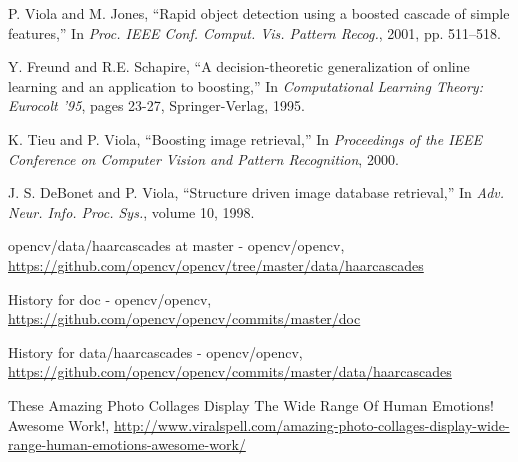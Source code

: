 \documentclass[10pt,twocolumn,letterpaper]{article}
\begin{document}
\begin{thebibliography}{9}
P. Viola and M. Jones, ``Rapid object detection using a boosted cascade of simple features,''
In \textit{Proc. IEEE Conf. Comput. Vis. Pattern Recog.}, 2001, pp. 511–518.

Y. Freund and R.E. Schapire, ``A decision-theoretic generalization of online learning and an application to boosting,''
In \textit{Computational Learning Theory: Eurocolt '95}, pages 23-27, Springer-Verlag, 1995.

K. Tieu and P. Viola, ``Boosting image retrieval,''
In \textit{Proceedings of the IEEE Conference on Computer Vision and Pattern Recognition}, 2000.

J. S. DeBonet and P. Viola, ``Structure driven image database retrieval,''
In \textit{Adv. Neur. Info. Proc. Sys.}, volume 10, 1998.

opencv/data/haarcascades at master - opencv/opencv,
\url{https://github.com/opencv/opencv/tree/master/data/haarcascades}

History for doc - opencv/opencv,
\url{https://github.com/opencv/opencv/commits/master/doc}

History for data/haarcascades - opencv/opencv,
\url{https://github.com/opencv/opencv/commits/master/data/haarcascades}

These Amazing Photo Collages Display The Wide Range Of Human Emotions! Awesome Work!,
\url{http://www.viralspell.com/amazing-photo-collages-display-wide-range-human-emotions-awesome-work/}

\end{thebibliography}
\end{document}
